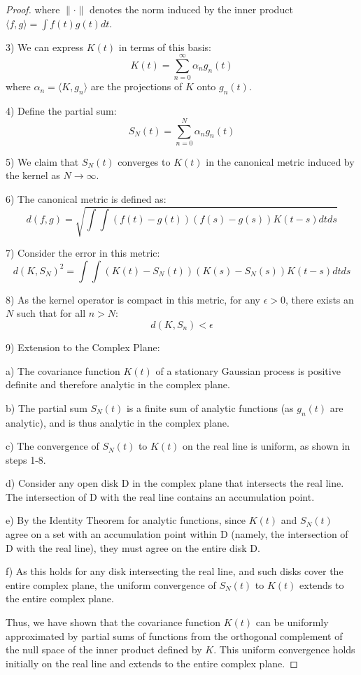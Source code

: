 \documentclass{article}
\begin{document}
\begin{proof}
   where $\|\cdot\|$ denotes the norm induced by the inner product $\langle f, g \rangle = \int f(t)g(t)dt$.

3) We can express $K(t)$ in terms of this basis:
   $$K(t) = \sum_{n=0}^{\infty} \alpha_n g_n(t)$$
   where $\alpha_n = \langle K, g_n \rangle$ are the projections of $K$ onto $g_n(t)$.

4) Define the partial sum:
   $$S_N(t) = \sum_{n=0}^N \alpha_n g_n(t)$$

5) We claim that $S_N(t)$ converges to $K(t)$ in the canonical metric induced by the kernel as $N \to \infty$.

6) The canonical metric is defined as:
   $$d(f,g) = \sqrt{\int\int (f(t) - g(t))(f(s) - g(s))K(t-s)dtds}$$

7) Consider the error in this metric:
   $$d(K, S_N)^2 = \int\int (K(t) - S_N(t))(K(s) - S_N(s))K(t-s)dtds$$

8) As the kernel operator is compact in this metric, for any $\epsilon > 0$, there exists an $N$ such that for all $n > N$:
   $$d(K, S_n) < \epsilon$$

9) Extension to the Complex Plane:
   
   a) The covariance function $K(t)$ of a stationary Gaussian process is positive definite and therefore analytic in the complex plane.
   
   b) The partial sum $S_N(t)$ is a finite sum of analytic functions (as $g_n(t)$ are analytic), and is thus analytic in the complex plane.
   
   c) The convergence of $S_N(t)$ to $K(t)$ on the real line is uniform, as shown in steps 1-8.
   
   d) Consider any open disk D in the complex plane that intersects the real line. The intersection of D with the real line contains an accumulation point.
   
   e) By the Identity Theorem for analytic functions, since $K(t)$ and $S_N(t)$ agree on a set with an accumulation point within D (namely, the intersection of D with the real line), they must agree on the entire disk D.
   
   f) As this holds for any disk intersecting the real line, and such disks cover the entire complex plane, the uniform convergence of $S_N(t)$ to $K(t)$ extends to the entire complex plane.

Thus, we have shown that the covariance function $K(t)$ can be uniformly approximated by partial sums of functions from the orthogonal complement of the null space of the inner product defined by $K$. This uniform convergence holds initially on the real line and extends to the entire complex plane.
\end{proof}
\end{document}
